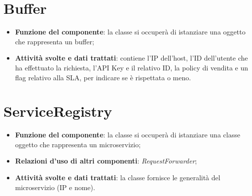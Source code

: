 \chapter{Buffer}
\begin{itemize}
	\item \textbf{Funzione del componente}: la classe si occuper\`{a} di istanziare una oggetto che rappresenta un buffer;
	\item \textbf{Attivit\`{a} svolte e dati trattati}: contiene l'IP dell'host, l'ID dell'utente che ha effettuato la richiesta, l'API Key e il relativo ID, la policy di vendita e un flag relativo alla SLA, per indicare se è rispettata o meno.
\end{itemize}

\chapter{ServiceRegistry}
\begin{itemize}
	\item \textbf{Funzione del componente}: la classe si occuper\`{a} di istanziare una classe oggetto che rappresenta un microservizio;
	\item \textbf{Relazioni d'uso di altri componenti}: \textit{RequestForwarder};
	\item \textbf{Attivit\`{a} svolte e dati trattati}: la classe fornisce le generalit\`{a} del microservizio (IP e nome).
\end{itemize}